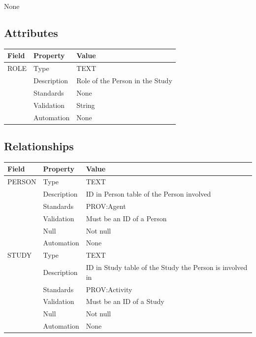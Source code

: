 None

\subsection{Attributes}\label{attributes-16}

\begin{longtable}[]{@{}lll@{}}
\toprule\noalign{}
Field & Property & Value \\
\midrule\noalign{}
\endhead
\bottomrule\noalign{}
\endlastfoot
ROLE & Type & TEXT \\
& Description & Role of the Person in the Study \\
& Standards & None \\
& Validation & String \\
& Automation & None \\
\end{longtable}

\subsection{Relationships}\label{relationships-14}

\begin{longtable}[]{@{}
  >{\raggedright\arraybackslash}p{}
  >{\raggedright\arraybackslash}p{}
  >{\raggedright\arraybackslash}p{}@{}}
\toprule\noalign{}
\begin{minipage}[b]{\linewidth}\raggedright
Field
\end{minipage} & \begin{minipage}[b]{\linewidth}\raggedright
Property
\end{minipage} & \begin{minipage}[b]{\linewidth}\raggedright
Value
\end{minipage} \\
\midrule\noalign{}
\endhead
\bottomrule\noalign{}
\endlastfoot
PERSON & Type & TEXT \\
& Description & ID in Person table of the Person involved \\
& Standards & PROV:Agent \\
& Validation & Must be an ID of a Person \\
& Null & Not null \\
& Automation & None \\
STUDY & Type & TEXT \\
& Description & ID in Study table of the Study the Person is involved
in \\
& Standards & PROV:Activity \\
& Validation & Must be an ID of a Study \\
& Null & Not null \\
& Automation & None \\
\end{longtable}

